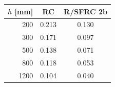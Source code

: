 \begin{tabular}{r cc}
\toprule
$h$ [mm] & RC & R/SFRC 2b\\
\midrule
200 & 0.213 & 0.130\\
300 & 0.171 & 0.097\\
500 & 0.138 & 0.071\\
800 & 0.118 & 0.053\\
1200 & 0.104 & 0.040\\
\bottomrule
\end{tabular}
